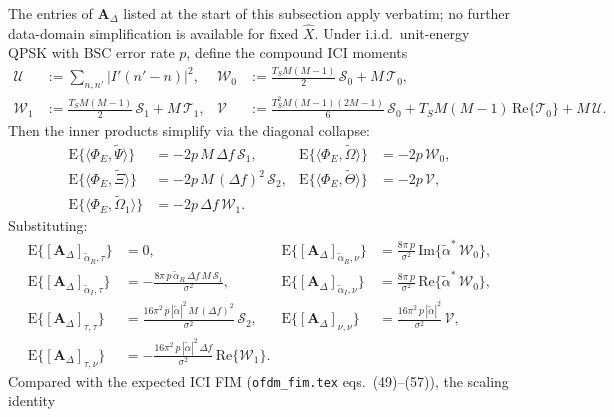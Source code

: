 \documentclass[11pt]{article}
\begin{document}
The entries of \(\bm{A}_\Delta\) listed at the start of this subsection apply verbatim; no further data-domain simplification is available for fixed \(\hat{X}\). Under i.i.d.\ unit-energy QPSK with BSC error rate \(p\), define the compound ICI moments
\begin{align}
    \mathcal{U} &:= \sum_{n,n'} |I'(n'-n)|^2, &
    \mathcal{W}_0 &:= \tfrac{T_S M(M-1)}{2}\, \mathcal{S}_0 + M\, \mathcal{T}_0, \\
    \mathcal{W}_1 &:= \tfrac{T_S M(M-1)}{2}\, \mathcal{S}_1 + M\, \mathcal{T}_1, &
    \mathcal{V} &:= \tfrac{T_S^2 M(M-1)(2M-1)}{6}\, \mathcal{S}_0 + T_S M(M-1)\, \mathrm{Re}\{\mathcal{T}_0\} + M\, \mathcal{U}.
\end{align}
Then the inner products simplify via the diagonal collapse:
\begin{align}
    \mathrm{E}\{\langle \Phi_E, \tilde{\Psi}\rangle\}     &= -2p\, M\, \Delta f\, \mathcal{S}_1, &
    \mathrm{E}\{\langle \Phi_E, \tilde{\Omega}\rangle\}   &= -2p\, \mathcal{W}_0, \\
    \mathrm{E}\{\langle \Phi_E, \tilde{\Xi}\rangle\}      &= -2p\, M\, (\Delta f)^2\, \mathcal{S}_2, &
    \mathrm{E}\{\langle \Phi_E, \tilde{\Theta}\rangle\}   &= -2p\, \mathcal{V}, \\
    \mathrm{E}\{\langle \Phi_E, \tilde{\Omega}_1\rangle\} &= -2p\, \Delta f\, \mathcal{W}_1. & &
\end{align}
Substituting:
\begin{align}
    \mathrm{E}\{[\bm{A}_\Delta]_{\tilde{\alpha}_R, \tau}\} &= 0, &
    \mathrm{E}\{[\bm{A}_\Delta]_{\tilde{\alpha}_R, \nu}\} &= \tfrac{8\pi\, p}{\sigma^2}\, \mathrm{Im}\{\tilde{\alpha}^*\, \mathcal{W}_0\}, \\
    \mathrm{E}\{[\bm{A}_\Delta]_{\tilde{\alpha}_I, \tau}\} &= -\tfrac{8\pi\, p\, \tilde{\alpha}_R\, \Delta f\, M\, \mathcal{S}_1}{\sigma^2}, &
    \mathrm{E}\{[\bm{A}_\Delta]_{\tilde{\alpha}_I, \nu}\} &= \tfrac{8\pi\, p}{\sigma^2}\, \mathrm{Re}\{\tilde{\alpha}^*\, \mathcal{W}_0\}, \\
    \mathrm{E}\{[\bm{A}_\Delta]_{\tau, \tau}\} &= \tfrac{16\pi^2\, p\, |\tilde{\alpha}|^2\, M\, (\Delta f)^2}{\sigma^2}\, \mathcal{S}_2, &
    \mathrm{E}\{[\bm{A}_\Delta]_{\nu, \nu}\} &= \tfrac{16\pi^2\, p\, |\tilde{\alpha}|^2}{\sigma^2}\, \mathcal{V}, \\
    \mathrm{E}\{[\bm{A}_\Delta]_{\tau, \nu}\} &= -\tfrac{16\pi^2\, p\, |\tilde{\alpha}|^2\, \Delta f}{\sigma^2}\, \mathrm{Re}\{\mathcal{W}_1\}. & &
\end{align}
Compared with the expected ICI FIM (\texttt{ofdm\_fim.tex} eqs.\ (49)--(57)), the scaling identity
\end{document}
